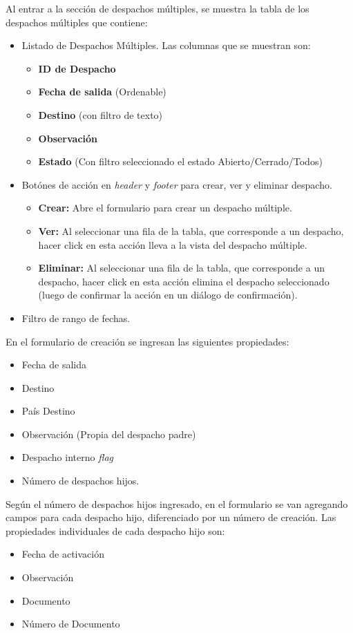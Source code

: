 Al entrar a la sección de despachos múltiples, se muestra la tabla de los despachos múltiples que contiene:
\begin{itemize}
    \item Listado de Despachos Múltiples. Las columnas que se muestran son:
    \begin{itemize}
        \item \textbf{ID de Despacho}
        \item \textbf{Fecha de salida} (Ordenable)
        \item \textbf{Destino} (con filtro de texto)
        \item \textbf{Observación}
        \item \textbf{Estado} (Con filtro seleccionado el estado Abierto/Cerrado/Todos)
    \end{itemize}
    \item Botónes de acción en \textit{header} y \textit{footer} para crear, ver y eliminar despacho.
    \begin{itemize}
        \item \textbf{Crear:} Abre el formulario para crear un despacho múltiple.
        \item \textbf{Ver:} Al seleccionar una fila de la tabla, que corresponde a un despacho, hacer click en esta acción lleva a la vista del despacho múltiple.
        \item \textbf{Eliminar:} Al seleccionar una fila de la tabla, que corresponde a un despacho, hacer click en esta acción elimina el despacho seleccionado (luego de confirmar la acción en un diálogo de confirmación).
    \end{itemize}
    \item Filtro de rango de fechas.
\end{itemize}

En el formulario de creación se ingresan las siguientes propiedades:
\begin{itemize}
    \item Fecha de salida
    \item Destino
    \item País Destino
    \item Observación (Propia del despacho padre)
    \item Despacho interno \textit{flag}    
    \item Número de despachos hijos.
\end{itemize}

Según el número de despachos hijos ingresado, en el formulario se van agregando campos para cada despacho hijo, diferenciado por un número de creación. Las propiedades individuales de cada despacho hijo son:
\begin{itemize}
    \item Fecha de activación
    \item Observación
    \item Documento
    \item Número de Documento
\end{itemize}

